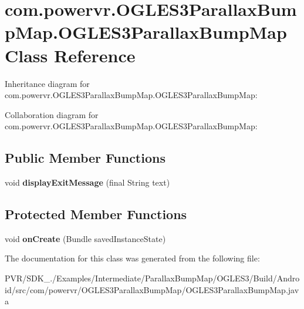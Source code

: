 \hypertarget{classcom_1_1powervr_1_1_o_g_l_e_s3_parallax_bump_map_1_1_o_g_l_e_s3_parallax_bump_map}{\section{com.\+powervr.\+O\+G\+L\+E\+S3\+Parallax\+Bump\+Map.\+O\+G\+L\+E\+S3\+Parallax\+Bump\+Map Class Reference}
\label{classcom_1_1powervr_1_1_o_g_l_e_s3_parallax_bump_map_1_1_o_g_l_e_s3_parallax_bump_map}
}


Inheritance diagram for com.\+powervr.\+O\+G\+L\+E\+S3\+Parallax\+Bump\+Map.\+O\+G\+L\+E\+S3\+Parallax\+Bump\+Map\+:


Collaboration diagram for com.\+powervr.\+O\+G\+L\+E\+S3\+Parallax\+Bump\+Map.\+O\+G\+L\+E\+S3\+Parallax\+Bump\+Map\+:
\subsection*{Public Member Functions}
\begin{DoxyCompactItemize}
\item 
\hypertarget{classcom_1_1powervr_1_1_o_g_l_e_s3_parallax_bump_map_1_1_o_g_l_e_s3_parallax_bump_map_ae59b419147f316e3661d17d346249d37}{void {\bfseries display\+Exit\+Message} (final String text)}\label{classcom_1_1powervr_1_1_o_g_l_e_s3_parallax_bump_map_1_1_o_g_l_e_s3_parallax_bump_map_ae59b419147f316e3661d17d346249d37}

\end{DoxyCompactItemize}
\subsection*{Protected Member Functions}
\begin{DoxyCompactItemize}
\item 
\hypertarget{classcom_1_1powervr_1_1_o_g_l_e_s3_parallax_bump_map_1_1_o_g_l_e_s3_parallax_bump_map_a8ac40f4a973b3da43b5f09defc10f593}{void {\bfseries on\+Create} (Bundle saved\+Instance\+State)}\label{classcom_1_1powervr_1_1_o_g_l_e_s3_parallax_bump_map_1_1_o_g_l_e_s3_parallax_bump_map_a8ac40f4a973b3da43b5f09defc10f593}

\end{DoxyCompactItemize}


The documentation for this class was generated from the following file\+:\begin{DoxyCompactItemize}
\item 
P\+V\+R/\+S\+D\+K\+\_./\+Examples/\+Intermediate/\+Parallax\+Bump\+Map/\+O\+G\+L\+E\+S3/\+Build/\+Android/src/com/powervr/\+O\+G\+L\+E\+S3\+Parallax\+Bump\+Map/O\+G\+L\+E\+S3\+Parallax\+Bump\+Map.\+java\end{DoxyCompactItemize}
